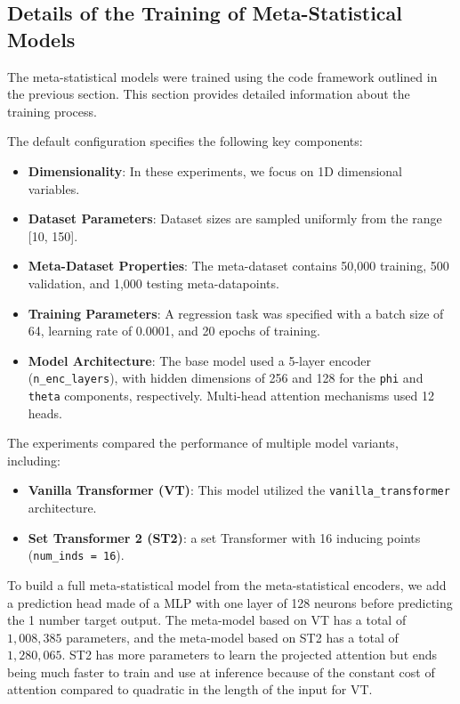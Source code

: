 \subsection{Details of the Training of Meta-Statistical Models}

The meta-statistical models were trained using the code framework outlined in the previous section. This section provides detailed information about the training process.

The default configuration specifies the following key components:
\begin{itemize}
    \item \textbf{Dimensionality}: In these experiments, we focus on 1D dimensional variables.
    \item \textbf{Dataset Parameters}: Dataset sizes are sampled uniformly from the range [10, 150].
    \item \textbf{Meta-Dataset Properties}: The meta-dataset contains 50,000 training, 500 validation, and 1,000 testing meta-datapoints.
    \item \textbf{Training Parameters}: A regression task was specified with a batch size of 64, learning rate of 0.0001, and 20 epochs of training.
    \item \textbf{Model Architecture}: The base model used a 5-layer encoder (\texttt{n\_enc\_layers}), with hidden dimensions of 256 and 128 for the \texttt{phi} and \texttt{theta} components, respectively. Multi-head attention mechanisms used 12 heads.
\end{itemize}

The experiments compared the performance of multiple model variants, including:
\begin{itemize}
     \item \textbf{Vanilla Transformer (VT)}: This model utilized the \texttt{vanilla\_transformer} architecture.
    \item \textbf{Set Transformer 2 (ST2)}: a set Transformer with 16 inducing points (\texttt{num\_inds = 16}).
\end{itemize}
To build a full meta-statistical model from the meta-statistical encoders, we add a prediction head made of a MLP with one layer of 128 neurons before predicting the 1 number target output. The meta-model based on VT has a total of $1,008,385$ parameters, and the meta-model based on ST2 has a total of $1,280,065$. ST2 has more parameters to learn the projected attention but ends being much faster to train and use at inference because of the constant cost of attention compared to quadratic in the length of the input for VT.

